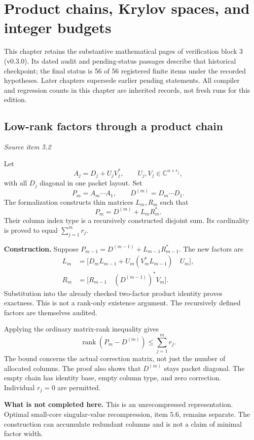 \clearpage\FloatBarrier\section{Product chains, Krylov spaces, and integer budgets}\label{supp3:section:001}
This chapter retains the substantive mathematical pages of verification block 3 (v0.3.0). Its dated audit and pending-status passages describe that historical checkpoint; the final status is 56 of 56 registered finite items under the recorded hypotheses. Later chapters supersede earlier pending statements. All compiler and regression counts in this chapter are inherited records, not fresh runs for this edition.\par

\subsection{Low-rank factors through a product chain}\label{supp3:subsection:001}\textit{Source item 5.2}\par
Let
\[
A_j=D_j+U_jV_j^*,\qquad U_j,V_j\in\mathbb C^{n\times r_j},
\]
with all $D_j$ diagonal in one packet layout. Set
\[
P_m=A_m\cdots A_1,\qquad D^{(m)}=D_m\cdots D_1.
\]
The formalization constructs thin matrices $L_m,R_m$ such that
\[
\boxed{P_m=D^{(m)}+L_mR_m^*.}
\]
Their column index type is a recursively constructed disjoint sum. Its cardinality is proved to equal $\sum_{j=1}^m r_j$.

\textbf{Construction.} Suppose $P_{m-1}=D^{(m-1)}+L_{m-1}R_{m-1}^*$. The new factors are
\begin{align*}
L_m&=\bigl[D_mL_{m-1}+U_m(V_m^*L_{m-1})\quad U_m\bigr],\\
R_m&=\bigl[R_{m-1}\quad (D^{(m-1)})^*V_m\bigr].
\end{align*}
Substitution into the already checked two-factor product identity proves exactness. This is not a rank-only existence argument. The recursively defined factors are themselves audited.

Applying the ordinary matrix-rank inequality gives
\[
\boxed{\operatorname{rank}(P_m-D^{(m)})\leq\sum_{j=1}^m r_j.}
\]
The bound concerns the actual correction matrix, not just the number of allocated columns. The proof also shows that $D^{(m)}$ stays packet diagonal. The empty chain has identity base, empty column type, and zero correction. Individual $r_j=0$ are permitted.

\textbf{What is not completed here.} This is an unrecompressed representation. Optimal small-core singular-value recompression, item 5.6, remains separate. The construction can accumulate redundant columns and is not a claim of minimal factor width.

